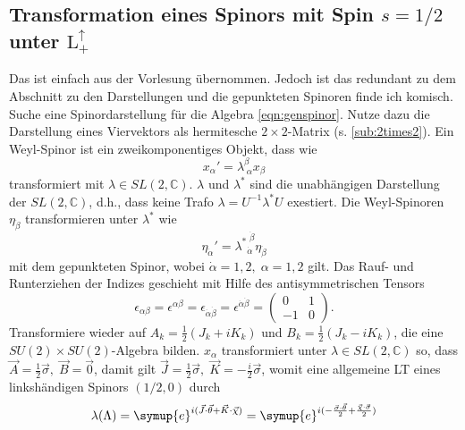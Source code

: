 \documentclass[
  captions=tableheading,  %
  titlepage=firstiscover, %
]{scrartcl}
\begin{document}
\subsection{Transformation eines Spinors mit Spin \texorpdfstring{$s = 1/2$}{PDFstring}
unter \texorpdfstring{$\text{L}_+^{\uparrow}$}{PDFstring}}
{\color{red} Das ist einfach aus der Vorlesung übernommen.
Jedoch ist das redundant zu dem Abschnitt zu den Darstellungen und die gepunkteten Spinoren 
finde ich komisch.}
Suche eine Spinordarstellung für die Algebra \eqref{eqn:genspinor}.
Nutze dazu die Darstellung eines Viervektors als hermitesche $2\times 2$-Matrix (s. \ref{sub:2times2}).
Ein Weyl-Spinor ist ein zweikomponentiges Objekt, dass wie 
\begin{equation*}
  x_{\alpha}' = \lambda_{\; \alpha}^{\beta} x_{\beta}
\end{equation*}
transformiert mit $\lambda \in SL(2, \mathbb{C})$.
$\lambda$ und $\lambda^*$ sind die unabhängigen Darstellung der $SL(2,\mathbb{C})$, d.h., dass 
keine Trafo $\lambda = U^{-1} \lambda^* U$ exestiert.
Die Weyl-Spinoren $\eta_{\dot{\beta}}$ transformieren unter $\lambda^*$ wie 
\begin{equation*}
  \eta_{\dot{\alpha}}' =  {\lambda^{*}}_{ \!\! \dot{\alpha}}^{\; \dot{\beta}} \eta_{\dot{\beta}}
\end{equation*}
mit dem gepunkteten Spinor, wobei $\dot{\alpha} = 1,2, \; \alpha  = 1,2$ gilt.
Das Rauf- und Runterziehen der Indizes geschieht mit Hilfe des antisymmetrischen Tensors  
\begin{equation*}
  \epsilon_{\alpha \beta} = \epsilon^{\alpha \beta} = \epsilon_{\dot{\alpha} \dot{\beta}} =
  \epsilon^{\dot{\alpha} \dot{\beta}}  = 
  \begin{pmatrix}
    0 & 1 \\
    -1 & 0
  \end{pmatrix} .
\end{equation*}
Transformiere wieder auf $A_k = \frac{1}{2} (J_k + i K_k)$ und $B_k = \frac{1}{2} (J_k - i K_k)$, die eine 
$SU(2) \times SU(2)$-Algebra bilden.
$x_{\alpha}$ transformiert unter $\lambda \in SL(2, \mathbb{C})$ so, dass 
$\vec{A} = \frac{1}{2}\vec{\sigma}, \; \vec{B} = \vec{0}$, damit gilt 
$\vec{J} =\frac{1}{2}\vec{\sigma}, \; \vec{K} = -\frac{i}{2}\vec{\sigma}$, womit eine 
allgemeine LT eines linkshändigen Spinors $(1/2, 0)$ durch 
\begin{equation*}
  \lambda (\Lambda) = \symup{e}^{i(\vec{J}\cdot \vec{\theta} + \vec{K} \cdot \vec{\chi})} 
  = \symup{e}^{i(-\frac{\vec{\sigma} \cdot \vec{\theta}}{2} + \frac{\vec{\chi} \cdot \vec{\sigma}}{2})}
\end{equation*}
\end{document}
